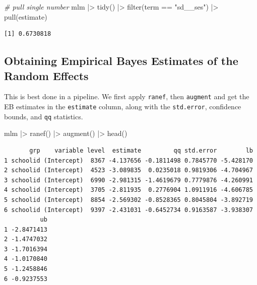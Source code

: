 \documentclass[
  letterpaper,
  DIV=11,
  numbers=noendperiod]{scrreprt}
\newenvironment{Shaded}{\begin{snugshade}}{\end{snugshade}}
\newcommand{\CommentTok}[1]{\textcolor[rgb]{0.38,0.63,0.69}{\textit{#1}}}
\newcommand{\FunctionTok}[1]{\textcolor[rgb]{0.02,0.16,0.49}{#1}}
\newcommand{\NormalTok}[1]{\textcolor[rgb]{0.00,0.44,0.13}{#1}}
\newcommand{\SpecialCharTok}[1]{\textcolor[rgb]{0.25,0.44,0.63}{#1}}
\newcommand{\StringTok}[1]{\textcolor[rgb]{0.25,0.44,0.63}{#1}}
\begin{document}
\begin{Shaded}
\begin{Highlighting}[]
\CommentTok{\# pull single number}
\NormalTok{mlm }\SpecialCharTok{|\textgreater{}} 
  \FunctionTok{tidy}\NormalTok{() }\SpecialCharTok{|\textgreater{}} 
  \FunctionTok{filter}\NormalTok{(term }\SpecialCharTok{==} \StringTok{"sd\_\_ses"}\NormalTok{) }\SpecialCharTok{|\textgreater{}} 
  \FunctionTok{pull}\NormalTok{(estimate)}
\end{Highlighting}
\end{Shaded}

\begin{verbatim}
[1] 0.6730818
\end{verbatim}

\hypertarget{obtaining-empirical-bayes-estimates-of-the-random-effects}{%
\subsection{Obtaining Empirical Bayes Estimates of the Random
Effects}\label{obtaining-empirical-bayes-estimates-of-the-random-effects}}

This is best done in a pipeline. We first apply \texttt{ranef}, then
\texttt{augment} and get the EB estimates in the \texttt{estimate}
column, along with the \texttt{std.error}, confidence bounds, and
\texttt{qq} statistics.

\begin{Shaded}
\begin{Highlighting}[]
\NormalTok{mlm }\SpecialCharTok{|\textgreater{}} 
  \FunctionTok{ranef}\NormalTok{() }\SpecialCharTok{|\textgreater{}} 
  \FunctionTok{augment}\NormalTok{() }\SpecialCharTok{|\textgreater{}} 
  \FunctionTok{head}\NormalTok{()}
\end{Highlighting}
\end{Shaded}

\begin{verbatim}
       grp    variable level  estimate         qq std.error        lb
1 schoolid (Intercept)  8367 -4.137656 -0.1811498 0.7845770 -5.428170
2 schoolid (Intercept)  4523 -3.089835  0.0235018 0.9819306 -4.704967
3 schoolid (Intercept)  6990 -2.981315 -1.4619679 0.7779876 -4.260991
4 schoolid (Intercept)  3705 -2.811935  0.2776904 1.0911916 -4.606785
5 schoolid (Intercept)  8854 -2.569302 -0.8528365 0.8045804 -3.892719
6 schoolid (Intercept)  9397 -2.431031 -0.6452734 0.9163587 -3.938307
          ub
1 -2.8471413
2 -1.4747032
3 -1.7016394
4 -1.0170840
5 -1.2458846
6 -0.9237553
\end{verbatim}
\end{document}
